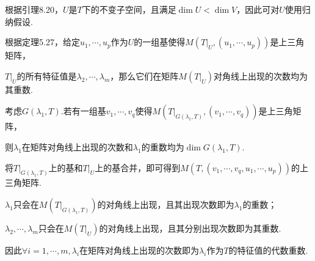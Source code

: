 根据引理8.20，\(U\)是\(T\)下的不变子空间，且满足\(\dim U<\dim V\)，因此可对\(U\)使用归纳假设.

根据定理5.27，给定\(u_1,\cdots,u_p\)作为\(U\)的一组基使得\(M(T|_U,(u_1,\cdots,u_p))\)是上三角矩阵，

\(T|_U\)的所有特征值是\(\lambda_2,\cdots,\lambda_m\)，那么它们在矩阵\(M(T|_U)\)对角线上出现的次数均为其重数.

考虑\(G(\lambda_1,T)\).若有一组基\(v_1,\cdots,v_q\)使得\(M(T|_{G(\lambda_1,T)},(v_1,\cdots,v_q))\)是上三角矩阵，

则\(\lambda_1\)在矩阵对角线上出现的次数和\(\lambda_1\)的重数均为\(\dim G(\lambda_1,T)\).

将\(T|_{G(\lambda_1,T)}\)上的基和\(T|_U\)上的基合并，即可得到\(M(T,(v_1,\cdots,v_q,u_1,\cdots,u_p))\)的上三角矩阵.

\(\lambda_1\)只会在\(M(T|_{G(\lambda_1,T)})\)的对角线上出现，且其出现次数即为\(\lambda_1\)的重数；

\(\lambda_2,\cdots,\lambda_m\)只会在\(M(T|_U)\)的对角线上出现，且其分别出现次数即为其重数.

因此\(\forall i=1,\cdots,m,\lambda_i\)在矩阵对角线上出现的次数即为\(\lambda_i\)作为\(T\)的特征值的代数重数.

